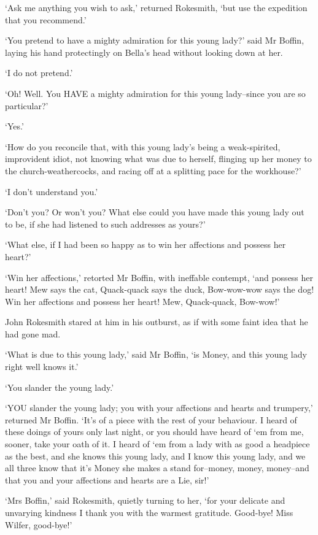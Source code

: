‘Ask me anything you wish to ask,’ returned Rokesmith, ‘but use the
expedition that you recommend.’

‘You pretend to have a mighty admiration for this young lady?’ said Mr
Boffin, laying his hand protectingly on Bella’s head without looking
down at her.

‘I do not pretend.’

‘Oh! Well. You HAVE a mighty admiration for this young lady--since you
are so particular?’

‘Yes.’

‘How do you reconcile that, with this young lady’s being a
weak-spirited, improvident idiot, not knowing what was due to herself,
flinging up her money to the church-weathercocks, and racing off at a
splitting pace for the workhouse?’

‘I don’t understand you.’

‘Don’t you? Or won’t you? What else could you have made this young lady
out to be, if she had listened to such addresses as yours?’

‘What else, if I had been so happy as to win her affections and possess
her heart?’

‘Win her affections,’ retorted Mr Boffin, with ineffable contempt,
‘and possess her heart! Mew says the cat, Quack-quack says the duck,
Bow-wow-wow says the dog! Win her affections and possess her heart! Mew,
Quack-quack, Bow-wow!’

John Rokesmith stared at him in his outburst, as if with some faint idea
that he had gone mad.

‘What is due to this young lady,’ said Mr Boffin, ‘is Money, and this
young lady right well knows it.’

‘You slander the young lady.’

‘YOU slander the young lady; you with your affections and hearts and
trumpery,’ returned Mr Boffin. ‘It’s of a piece with the rest of your
behaviour. I heard of these doings of yours only last night, or you
should have heard of ‘em from me, sooner, take your oath of it. I heard
of ‘em from a lady with as good a headpiece as the best, and she knows
this young lady, and I know this young lady, and we all three know that
it’s Money she makes a stand for--money, money, money--and that you and
your affections and hearts are a Lie, sir!’

‘Mrs Boffin,’ said Rokesmith, quietly turning to her, ‘for your delicate
and unvarying kindness I thank you with the warmest gratitude. Good-bye!
Miss Wilfer, good-bye!’

